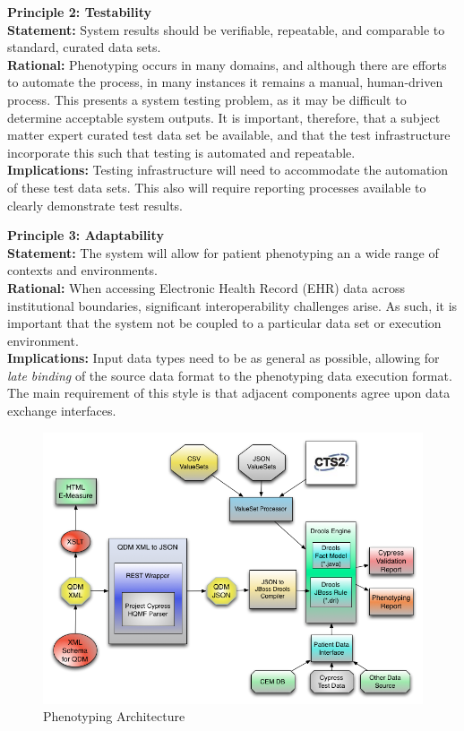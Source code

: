 \documentclass{amia}
\begin{document}
\textbf{Principle 2: Testability}\\
\textbf{Statement:} System results should be verifiable, repeatable, and comparable to standard, curated data sets.\\
\textbf{Rational:} Phenotyping occurs in many domains, and although there are efforts to automate the process\cite{chung2008automated,kyzar2011towards}, in many instances it remains a manual, human-driven process. This presents a system testing problem, as it may be difficult to determine acceptable system outputs. It is important, therefore, that a subject matter expert curated test data set be available, and that the test infrastructure incorporate this such that testing is automated and repeatable.\\
\textbf{Implications:} Testing infrastructure will need to accommodate the automation of these test data sets. This also will require reporting processes available to clearly demonstrate test results.

\textbf{Principle 3: Adaptability}\\
\textbf{Statement:} The system will allow for patient phenotyping an a wide range of contexts and environments.\\
\textbf{Rational:} When accessing Electronic Health Record (EHR) data across institutional boundaries, significant interoperability challenges arise\cite{chute2011sharpn}. As such, it is important that the system not be coupled to a particular data set or execution environment.\\
\textbf{Implications:} Input data types need to be as general as possible, allowing for \textit{late binding} of the source data format to the phenotyping data execution format. The main requirement of this style is that adjacent components agree upon data exchange interfaces. 

\begin{figure}
\includegraphics[width=\textwidth]{htp-drools-arch}
\caption{Phenotyping Architecture} 
\label{fig:overall_arch}
\end{figure}
\end{document}

